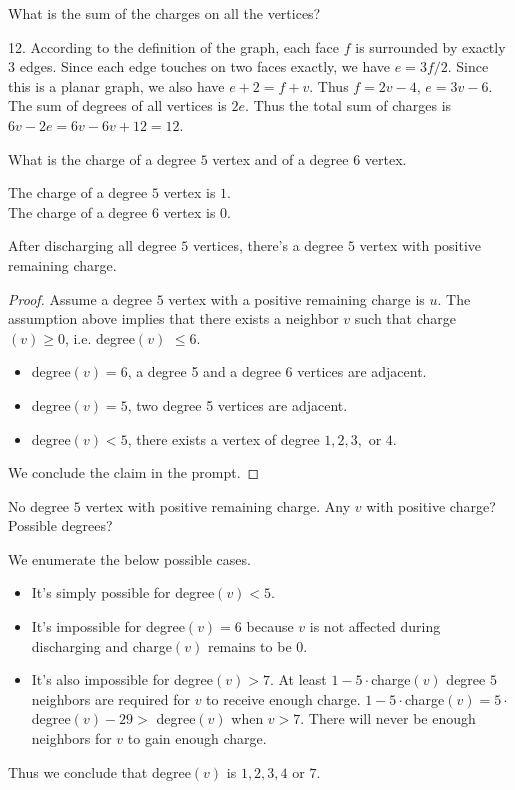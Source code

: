\documentclass[11pt]{article}
\begin{document}
\begin{Parts}
    \Part What is the sum of the charges on all the vertices? 
    \begin{Answer}
        12. According to the definition of the graph, each face $f$ is surrounded by exactly $3$ edges. Since each edge touches 
        on two faces exactly, we have $e=3f/2$. Since this is a planar graph, we also have $e+2=f+v$. Thus $f=2v-4$, $e=3v-6$. 
        The sum of degrees of all vertices is $2e$. Thus the total sum of charges is $6v-2e=6v-6v+12=12$.
    \end{Answer}

    \Part What is the charge of a degree $5$ vertex and of a degree $6$ vertex. 
    \begin{Answer}
        The charge of a degree $5$ vertex is $1$. \\
        The charge of a degree $6$ vertex is $0$. 
    \end{Answer}
    
    \Part After discharging all degree $5$ vertices, there's a degree $5$ vertex with positive remaining charge. 
    \begin{Answer}
        \begin{proof}
            Assume a degree $5$ vertex with a positive remaining charge is $u$. The assumption above implies that
            there exists a neighbor $v$ such that charge$(v) \geq 0$, i.e. degree$(v)$ $\leq 6$.
            \begin{itemize}
                \item degree$(v)=6$, a degree 5 and a degree 6 vertices are adjacent. 
                \item degree$(v)=5$, two degree 5 vertices are adjacent. 
                \item degree$(v)<5$, there exists a vertex of degree $1,2,3,$ or $4$. 
            \end{itemize}
            We conclude the claim in the prompt.
        \end{proof}
    \end{Answer}

    \Part No degree $5$ vertex with positive remaining charge. Any $v$ with positive charge? Possible degrees?
    \begin{Answer}
        We enumerate the below possible cases. 
        \begin{itemize}
            \item It's simply possible for degree$(v)<5$.
            \item It's impossible for degree$(v)=6$ because $v$ is not affected during discharging and charge$(v)$ remains to be $0$. 
            \item It's also impossible for degree$(v)>7$.  At least $1-5\cdot$charge$(v)$ degree $5$ neighbors are 
                  required for $v$ to receive enough charge. $1-5\cdot$charge$(v)=5\cdot$degree$(v)-29>$ degree$(v)$ when $v>7$. 
                  There will never be enough neighbors for $v$ to gain enough charge.
        \end{itemize}
        Thus we conclude that degree$(v)$ is $1,2,3,4$ or $7$. 
    \end{Answer}


\end{Parts}
\end{document}
